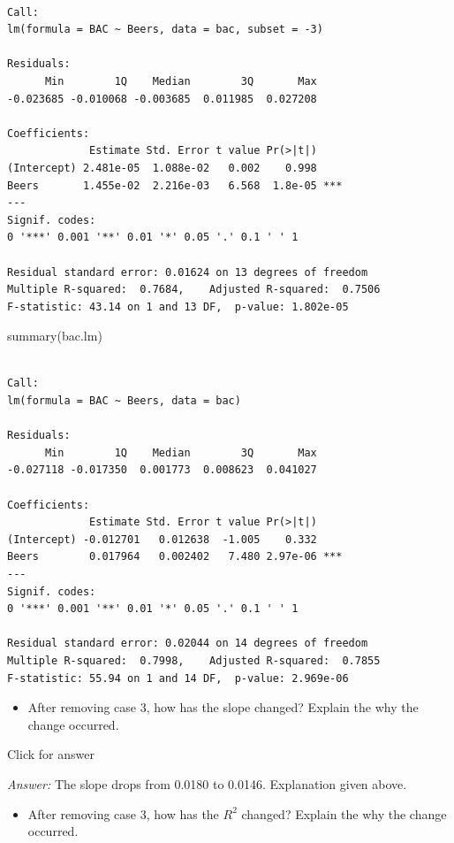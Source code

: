 \documentclass[
]{book}
\newenvironment{Shaded}{\begin{snugshade}}{\end{snugshade}}
\newcommand{\FunctionTok}[1]{\textcolor[rgb]{0.00,0.00,0.00}{#1}}
\newcommand{\NormalTok}[1]{#1}
\providecommand{\tightlist}{%
  \setlength{\itemsep}{0pt}\setlength{\parskip}{0pt}}
\begin{document}
\begin{verbatim}

Call:
lm(formula = BAC ~ Beers, data = bac, subset = -3)

Residuals:
      Min        1Q    Median        3Q       Max 
-0.023685 -0.010068 -0.003685  0.011985  0.027208 

Coefficients:
             Estimate Std. Error t value Pr(>|t|)    
(Intercept) 2.481e-05  1.088e-02   0.002    0.998    
Beers       1.455e-02  2.216e-03   6.568  1.8e-05 ***
---
Signif. codes:  
0 '***' 0.001 '**' 0.01 '*' 0.05 '.' 0.1 ' ' 1

Residual standard error: 0.01624 on 13 degrees of freedom
Multiple R-squared:  0.7684,    Adjusted R-squared:  0.7506 
F-statistic: 43.14 on 1 and 13 DF,  p-value: 1.802e-05
\end{verbatim}

\begin{Shaded}
\begin{Highlighting}[]
\FunctionTok{summary}\NormalTok{(bac.lm)}
\end{Highlighting}
\end{Shaded}

\begin{verbatim}

Call:
lm(formula = BAC ~ Beers, data = bac)

Residuals:
      Min        1Q    Median        3Q       Max 
-0.027118 -0.017350  0.001773  0.008623  0.041027 

Coefficients:
             Estimate Std. Error t value Pr(>|t|)    
(Intercept) -0.012701   0.012638  -1.005    0.332    
Beers        0.017964   0.002402   7.480 2.97e-06 ***
---
Signif. codes:  
0 '***' 0.001 '**' 0.01 '*' 0.05 '.' 0.1 ' ' 1

Residual standard error: 0.02044 on 14 degrees of freedom
Multiple R-squared:  0.7998,    Adjusted R-squared:  0.7855 
F-statistic: 55.94 on 1 and 14 DF,  p-value: 2.969e-06
\end{verbatim}

\begin{itemize}
\tightlist
\item
  After removing case 3, how has the slope changed? Explain the why the change occurred.
\end{itemize}

Click for answer

\emph{Answer:} The slope drops from 0.0180 to 0.0146. Explanation given above.

\begin{itemize}
\tightlist
\item
  After removing case 3, how has the \(R^2\) changed? Explain the why the change occurred.
\end{itemize}
\end{document}
